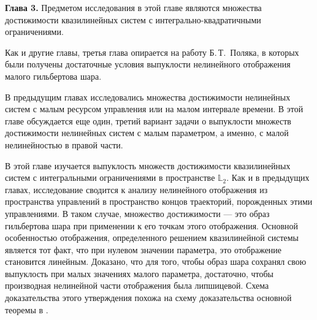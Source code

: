 \documentclass[../main.tex]{subfiles}
\begin{document}
\textbf{Глава 3. }
Предметом исследования в этой главе являются множества достижимости квазилинейных систем с интегрально-квадратичными ограничениями.

Как и другие главы, третья глава опирается на работу Б.\,Т.~Поляка\cite{Polyak2001}, в которых были получены достаточные условия выпуклости нелинейного отображения малого гильбертова шара.

В предыдущим главах исследовались множества достижимости нелинейных систем  с малым ресурсом управления или на малом интервале времени.
В этой главе обсуждается еще один, третий вариант задачи о выпуклости множеств достижимости нелинейных систем с малым параметром, а именно, с малой нелинейностью в правой части. 

В этой главе изучается выпуклость множеств достижимости квазилинейных систем с интегральными ограничениями в пространстве $\mathbb{L}_2$. 
Как и в предыдущих главах,  исследование сводится к анализу нелинейного отображения из пространства управлений в пространство концов траекторий, порожденных этими управлениями.
В таком случае, множество достижимости --- это образ гильбертова шара при применении к его точкам этого отображения. 
Основной особенностью отображения, определенного решением квазилинейной системы является тот факт, что при нулевом значении параметра, это отображение становится линейным.
Доказано, что для того, чтобы образ шара сохранял свою выпуклость при малых значениях малого параметра, достаточно, чтобы производная нелинейной части отображения была липшицевой. 
Схема доказательства этого утверждения похожа на схему доказательства основной теоремы в \cite{Polyak2001}.
\pagebreak
\end{document}

